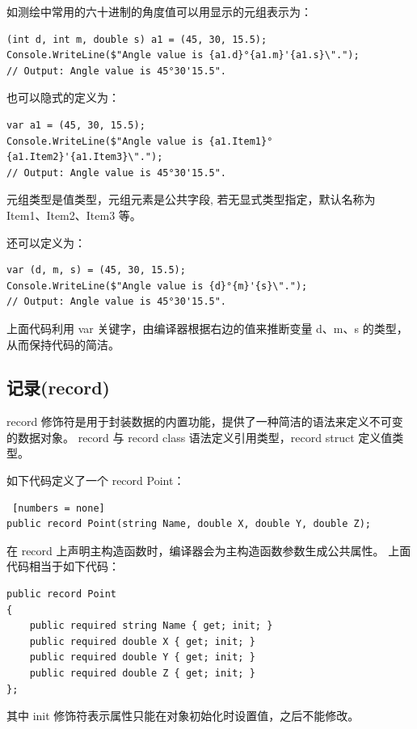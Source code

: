 如测绘中常用的六十进制的角度值可以用显示的元组表示为：

\begin{lstlisting}
(int d, int m, double s) a1 = (45, 30, 15.5);
Console.WriteLine($"Angle value is {a1.d}°{a1.m}'{a1.s}\".");
// Output: Angle value is 45°30'15.5".
\end{lstlisting}

也可以隐式的定义为：

\begin{lstlisting}
var a1 = (45, 30, 15.5);
Console.WriteLine($"Angle value is {a1.Item1}°{a1.Item2}'{a1.Item3}\".");
// Output: Angle value is 45°30'15.5".
\end{lstlisting}

元组类型是值类型，元组元素是公共字段, 若无显式类型指定，默认名称为 Item1、Item2、Item3 等。

还可以定义为：

\begin{lstlisting}
var (d, m, s) = (45, 30, 15.5);
Console.WriteLine($"Angle value is {d}°{m}'{s}\".");
// Output: Angle value is 45°30'15.5".
\end{lstlisting}

上面代码利用 var 关键字，由编译器根据右边的值来推断变量 d、m、s 的类型， 从而保持代码的简洁。

\subsection{记录(record)}

record 修饰符是用于封装数据的内置功能，提供了一种简洁的语法来定义不可变的数据对象。
record 与 record class 语法定义引用类型，record struct 定义值类型。

如下代码定义了一个 record Point：

\begin{lstlisting} [numbers = none]
public record Point(string Name, double X, double Y, double Z);
\end{lstlisting}

在 record 上声明主构造函数时，编译器会为主构造函数参数生成公共属性。
上面代码相当于如下代码：

\begin{lstlisting}
public record Point
{
    public required string Name { get; init; }
    public required double X { get; init; }
    public required double Y { get; init; }
    public required double Z { get; init; }
};
\end{lstlisting}

其中 init 修饰符表示属性只能在对象初始化时设置值，之后不能修改。

